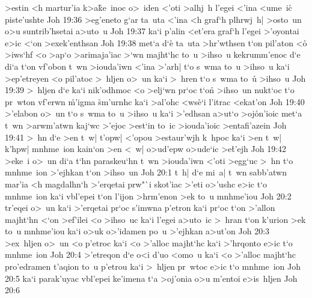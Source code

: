 >estin
<h
martur'ia
k>a\r{k}e~inoc
o>~iden
<'oti
>alhj~h
l'egei
<'ina
<ume~ic\r{}
piste'ushte\bibvsend
\vs Joh 19:36
>eg'eneto
g`ar
ta~uta
<'ina
<h
graf`h
plhrwj~h|
>osto~un
o>u
suntrib'hsetai
a>uto~u\bibvsend
\vs Joh 19:37
ka`i
p'alin
<et'era
graf`h
l'egei
>'oyontai
e>ic
<`on
>exek'enthsan\bibvsend
\vs Joh 19:38
met`a
d`e\r{}
ta~uta
>hr'wthsen
t`on
pil'aton
<o\r{}
>iws`hf
<o
>ap`o
>arimaja'iac
>`wn
majht`hc
to~u
>ihso~u
kekrumm'enoc
d`e
di`a
t`on
vf'obon
t~wn
>iouda'iwn
<'ina
>'arh|
t`o
s~wma
to~u
>ihso~u
ka`i
>ep'etreyen
<o
pil'atoc
>~hljen
o>~un
ka`i
>~hren
t`o
s~wma
to~u\r{}
>ihso~u\bibvsend
\vs Joh 19:39
>~hljen
d`e
ka`i
nik'odhmoc
<o
>elj`wn
pr`oc
t`on\r{}
>ihso~un
nukt`oc
t`o
pr~wton
vf'erwn
\r{m}'igma
\r{s}m'urnhc
ka`i
>al'ohc
<ws\r{e}`i
l'itrac
<ekat'on\bibvsend
\vs Joh 19:40
>'elabon
o>~un
t`o
s~wma
to~u
>ihso~u
ka`i
>'edhsan
a>ut`o
>oj\r{o}n'ioic
met`a
t~wn
>arwm'atwn
kaj`wc
>'ejoc
>est`in
to~ic
>iouda'ioic
>entafi'azein\bibvsend
\vs Joh 19:41
>~hn
d`e
>en
t~w|
t'opw|
<'opou
>estaur'wjh
k~hpoc
ka`i
>en
t~w|
k'hpw|
mnhme~ion
kain`on
>en
<~w|
o>ud'epw
o>ude`ic
>e\r{t}'ejh\bibvsend
{}
\vs Joh 19:42
>eke~i
o>~un
di`a
t`hn
paraskeu`hn
t~wn
>iouda'iwn
<'oti
>egg`uc
>~hn
t`o
mnhme~ion
>'ejhkan
t`on
>ihso~un\bibvsend
\vs Joh 20:1
t~h|
d`e
mi~a|
t~wn
sabb'atwn
mar'ia
<h
magdalhn`h
>'erqetai
prw"`i
skot'iac
>'eti
o>'ushc
e>ic
t`o
mnhme~ion
ka`i
vbl'epei
t`on
l'ijon
>hrm'enon
>ek
to~u
mnhme'iou\bibvsend
\vs Joh 20:2
tr'eqei
o>~un
ka`i
>'erqetai
pr`oc
s'imwna
p'etron
ka`i
pr`oc
t`on
>'allon
majht`hn
<`on
>ef'ilei
<o
>ihso~uc
ka`i
l'egei
a>uto~ic
>~hran
t`on
k'urion
>ek
to~u
mnhme'iou
ka`i
o>uk
o>'idamen
po~u
>'ejhkan
a>ut'on\bibvsend
\vs Joh 20:3
>ex~hljen
o>~un
<o
p'etroc
ka`i
<o
>'alloc
majht`hc
ka`i
>'hrqonto
e>ic
t`o
mnhme~ion\bibvsend
\vs Joh 20:4
>'etreqon
d`e
o<i
d'uo
<omo~u
ka`i
<o
>'alloc
majht`hc
pro'edramen
t'aqion
to~u
p'etrou
ka`i
>~hljen
pr~wtoc
e>ic
t`o
mnhme~ion\bibvsend
\vs Joh 20:5
ka`i
parak'uyac
vbl'epei
ke'imena
t`a
>oj'onia
o>u
m'entoi
e>is~hljen\bibvsend
\vs Joh 20:6
